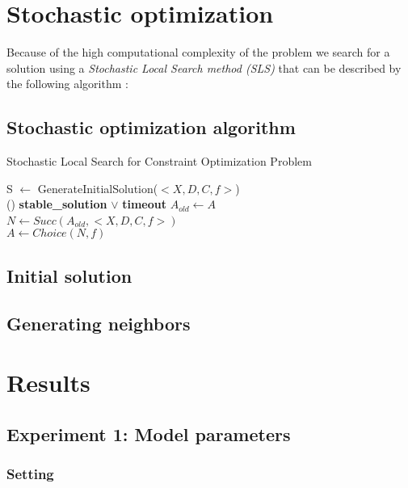 \documentclass[11pt]{article}
\begin{document}
\section{Stochastic optimization}

Because of the high computational complexity of the problem we search for a solution using a \textit{Stochastic Local Search method (SLS)} that can be described by the following algorithm :


\subsection{Stochastic optimization algorithm}

\begin{algorithm}[H]
    \SetAlgoLined
    \caption{Stochastic Local Search for Constraint Optimization Problem}
    S $\leftarrow$ GenerateInitialSolution($<X,D,C,f>$) \\
    \Repeat(){  \textbf{stable\_solution} $\lor$ \textbf{timeout} }{
        $A_{old} \leftarrow A$ \\
        $N \leftarrow Succ(A_{old},<X,D,C,f>)$ \\
        $A \leftarrow Choice(N,f)$
    }
\end{algorithm}

\subsection{Initial solution}

\subsection{Generating neighbors}



\section{Results}

\subsection{Experiment 1: Model parameters}

\subsubsection{Setting}
\end{document}
